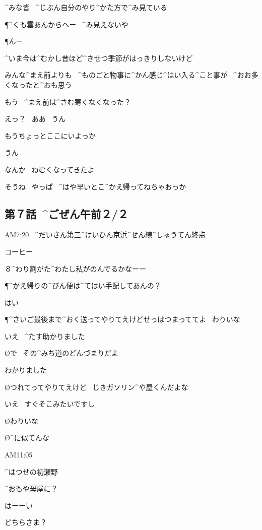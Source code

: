 \page
\A ^{みな}{皆}
\ ^{じぶん}{自分}のやり^{かた}{方}で^{み}{見}ている

\P ^{くも}{雲}あんからへー
\ ^{み}{見}えないや

\P んー

\A ^{いま}{今}は^{むかし}{昔}ほど^{きせつ}{季節}がはっきりしないけど

\A みんな^{まえ}{前}よりも
\ ^{ものごと}{物事}に^{かん}{感}じ^{はい}{入}る^{こと}{事}が
\ ^{おお}{多}くなったと^{おも}{思}う

\page
\T もう
\ ^{まえ}{前}は^{さむ}{寒}くなくなった？

\A えっ？
\ ああ
\ うん

\A もうちょっとここにいよっか

\A うん

\page
\T なんか
\ ねむくなってきたよ

\A そうね
\ やっぱ
\ ^{はや}{早}いとこ^{かえ}{帰}ってねちゃおっか


\subsection{第７話\ ^{ごぜん}{午前}２/２}

\page[132]
\N AM7:20
\ ^{だいさん}{第三}^{けいひん}{京浜}^{せん}{線}^{しゅうてん}{終点}

\page[138]
\A コーヒー

\A ８^{わり}{割}がた^{わたし}{私}がのんでるかなーー

\page
\P ^{かえ}{帰}りの^{びん}{便}は^{てはい}{手配}してあんの？

\K はい

\P ^{さいご}{最後}まで^{おく}{送}ってやりてえけどせっぱつまっててよ
\ わりいな

\K いえ
\ ^{たす}{助}かりました

\page[141]
\O で
\ その^{みち}{道}のどんづまりだよ

\K わかりました

\O つれてってやりてえけど
\ じきガソリン^{や}{屋}くんだよな

\K いえ
\ すぐそこみたいですし

\O わりいな

\O ^{に}{似}てんな

\page
\N AM11:05

\page
\K ^{はつせの}{初瀬野}

\page
\A ^{おもや}{母屋}に？

\A はーーい

\A どちらさま？

